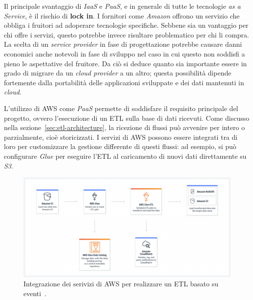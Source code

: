 Il principale svantaggio di \textit{IaaS} e \textit{PaaS}, e in generale di tutte le tecnologie \textit{as a Service}, è il rischio di \textbf{lock in}.
I fornitori come \textit{Amazon} offrono un servizio che obbliga i fruitori ad adoperare tecnologie specifiche.
Sebbene sia un vantaggio per chi offre i servizi, questo potrebbe invece risultare problematico per chi li compra.
La scelta di un \textit{service provider} in fase di progettazione potrebbe causare danni economici anche notevoli in fase di sviluppo nel caso in cui questo non soddisfi a pieno le aspettative del fruitore.
Da ciò si deduce quanto sia importante essere in grado di migrare da un \textit{cloud provider} a un altro;
questa possibilità dipende fortemente dalla portabilità delle applicazioni sviluppate e dei dati mantenuti in \textit{cloud}.

L'utilizzo di AWS come \textit{PaaS} permette di soddisfare il requisito principale del progetto, ovvero l'esecuzione di un ETL sulla base di dati ricevuti.
Come discusso nella sezione~\ref{sec:etl-architecture}, la ricezione di flussi può avvenire per intero o parzialmente, cioè storicizzati.
I servizi di AWS possono essere integrati tra di loro per customizzare la gestione differente di questi flussi:
ad esempio, si può configurare \textit{Glue} per eseguire l'ETL al caricamento di nuovi dati direttamente su \textit{S3}.

\begin{figure}
    \includegraphics[width=\textwidth]{img/event-based-etl-on-glue.png}
    \centering
    \caption{Integrazione dei serivizi di AWS per realizzare un ETL basato su eventi~\cite{aws-glue}.}
    \label{fig:event-based-etl-on-glue}
\end{figure}
